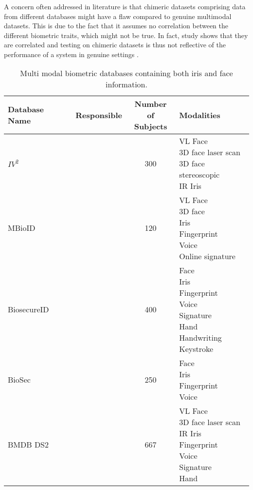 A concern often addressed in literature is that chimeric datasets comprising data from different databases might have a flaw compared to genuine multimodal datasets. This is due to the fact that it assumes no correlation between the different biometric traits, which might not be true. In fact, study shows that they are correlated and testing on chimeric datasets is thus not reflective of the performance of a system in genuine settings \citep{Al-Waisy2017a}.    

\begin{table}[H]
\centering
\caption{Multi modal biometric databases containing both iris and face information.}
\begin{tabularx}{1.2\textwidth}{ XccX }
\hline
\rowcolor{Grey}
\textbf{Database Name}&\textbf{Responsible}&\makecell{\textbf{Number of} \\ \textbf{Subjects}}&\textbf{Modalities}\\
\hline
$IV^2$&\cite{Petrovska-Delacretaz2008a}&300&\makecell{VL Face\\3D face laser scan\\ 3D face stereoscopic\\IR Iris}\\
\hline
\rowcolor{lightGrey}
MBioID&\cite{Dessimoz2007}&120&\makecell{VL Face\\3D face \\ Iris\\Fingerprint\\Voice\\ Online signature}\\
\hline
BiosecureID&\cite{BiosecID2008}&400&\makecell{Face\\Iris\\Fingerprint\\Voice\\Signature\\Hand\\Handwriting\\Keystroke}\\
\hline
\rowcolor{lightGrey}
BioSec&\cite{Biosec2007}&250&\makecell{Face\\ Iris\\Fingerprint\\Voice}\\
\hline
BMDB DS2&\cite{Ortega-Garcia2010}&667&\makecell{VL Face\\3D face laser scan\\ IR Iris\\Fingerprint\\Voice\\Signature\\Hand }\\

\end{tabularx}
\end{table}
